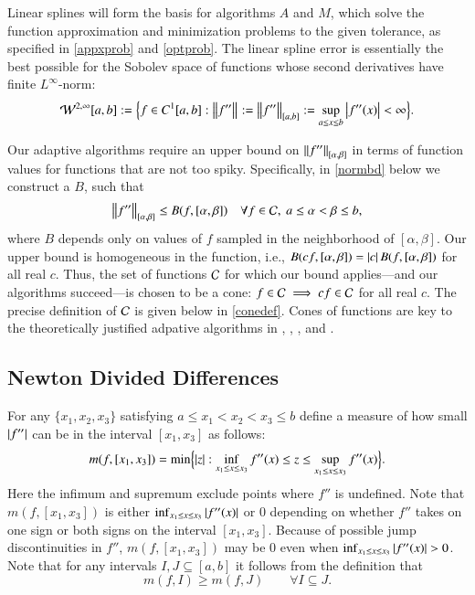 \documentclass[review]{elsarticle}
\begin{document}
Linear splines will form the basis for algorithms $A$ and $M$, which solve the function approximation and minimization problems to the given tolerance, as specified in \eqref{appxprob} and \eqref{optprob}. The linear spline error is essentially the best possible for the Sobolev space of functions whose second derivatives have finite $L^{\infty}$-norm:
\[
\cw^{2,\infty}[a,b] : = \Bigl \{f \in C^1[a,b] : \norm{f''} : = \norm[{[a,b]}]{f''} : = \sup_{a \le x \le b} \abs{f''(x)} <  \infty \Bigr\}.
\]

Our adaptive algorithms require an upper bound on $\norm[{[\alpha, \beta]}]{f''}$ in terms of function values for functions that are not too spiky.  Specifically, in \eqref{normbd} below we construct a $B$, such that 
\[
\norm[{[\alpha, \beta]}]{f''} \le B(f,[\alpha,\beta]) \quad \forall f \in \cc, \ a \le \alpha < \beta \le b,
\]
where $B$ depends only on values of $f$ sampled in the neighborhood of $[\alpha, \beta]$.  Our upper bound is homogeneous in the function, i.e., $B(cf,[\alpha,\beta]) = \abs{c} B(f,[\alpha,\beta])$ for all real $c$.  Thus, the set of functions $\cc$ for which our bound applies---and our algorithms succeed---is chosen to be a cone: $f \in \cc \implies cf \in \cc$  for all real $c$.  The precise definition of $\cc$ is given below in \eqref{conedef}.   Cones of functions are key to the theoretically justified adpative algorithms  in \cite{HicEtal14b},  \cite{Din15a}, \cite{Ton14a}, and \cite{HicRazYun15a}. 

\subsection{Newton Divided Differences} \label{sec:ndd}

For any $\{x_1, x_2, x_3\}$ satisfying $a \le x_1 < x_2 < x_3 \le b$ define a measure of how small $\abs{f''}$ can be in the interval $[x_1, x_3]$ as follows:
\begin{equation} \label{minfppdef}
m(f,[x_1, x_3]) = \min \Bigl\{ \abs{z}  : \inf_{x_1 \le x \le x_3} f''(x) \le z \le \sup_{x_1 \le x \le x_3} f''(x) \Bigr\}.
\end{equation}
Here the infimum and supremum exclude points where $f''$ is undefined.  Note that $m(f,[x_1, x_3])$ is either $ \inf_{x_1 \le x \le x_3} \abs{f''(x)}$ or $0$ depending on whether $f''$ takes on one sign or both signs on the interval  $[x_1, x_3]$.  Because of possible jump discontinuities in $f''$, $m(f,[x_1, x_3])$ may be $0$ even when $\inf_{x_1 \le x \le x_3} \abs{f''(x)} > 0$.  Note that for any intervals $I , J \subseteq [a,b]$ it follows from the definition that
\begin{equation} \label{mdec}
m(f,I) \ge m(f,J) \qquad \forall I \subseteq J.
\end{equation}
\end{document}
